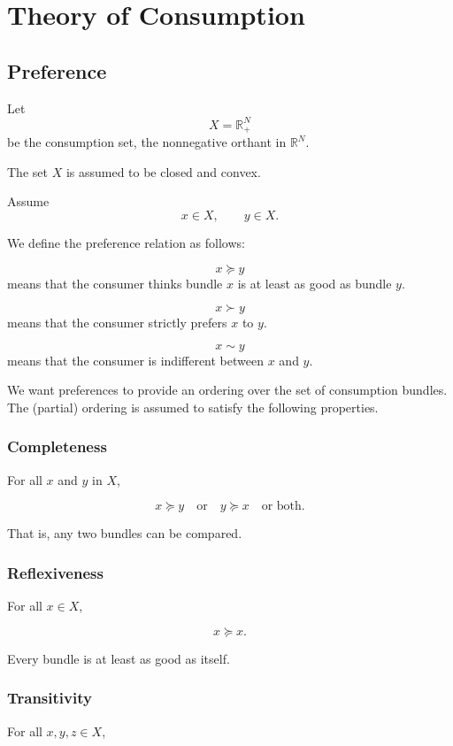 \chapter{Theory of Consumption}

\section{Preference}

Let
\[
X = \mathbb{R}_+^N
\]
be the consumption set, the nonnegative orthant in \(\mathbb{R}^N\).

The set \(X\) is assumed to be closed and convex.

Assume
\[
x \in X, \qquad y \in X.
\]

We define the preference relation as follows:

\[
x \succeq y
\]
means that the consumer thinks bundle \(x\) is at least as good as bundle \(y\).

\[
x \succ y
\]
means that the consumer strictly prefers \(x\) to \(y\).

\[
x \sim y
\]
means that the consumer is indifferent between \(x\) and \(y\).

We want preferences to provide an ordering over the set of consumption bundles.  
The (partial) ordering is assumed to satisfy the following properties.

\subsection{Completeness}

For all \(x\) and \(y\) in \(X\),

\[
x \succeq y
\quad \text{or} \quad
y \succeq x
\quad \text{or both.}
\]

That is, any two bundles can be compared.

\subsection{Reflexiveness}

For all \(x \in X\),

\[
x \succeq x.
\]

Every bundle is at least as good as itself.

\subsection{Transitivity}

For all \(x,y,z \in X\),

